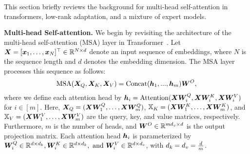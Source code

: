 
This section briefly reviews the background for multi-head self-attention in transformers, low-rank adaptation, and a mixture of expert models.

\vspace{0.5 em}
\noindent
\textbf{Multi-head Self-attention.} We begin by revisiting the architecture of the multi-head self-attention (MSA) layer in Transformer~\cite {vaswani2017attention, dosovitskiy2020image}. Let ${\bm X} = [{\bm x}_1, \dots, {\bm x}_N]^\top \in \mathbb{R}^{N \times d}$ denote an input sequence of embeddings, where $N$ is the sequence length and $d$ denotes the embedding dimension. The MSA layer processes this sequence as follows:
\begin{align}
    \mathrm{MSA}({\bm X}_Q, {\bm X}_K, {\bm X}_V) = \mathrm{Concat}({\bm h}_1,...,{\bm h}_m) \bm{W}^O, \label{eq:msa}
\end{align}
where we define each attention head by ${\bm h}_i = \mathrm{Attention}({\bm X} \bm{W}_i^Q, {\bm X} \bm{W}_i^K, {\bm X} \bm{W}_i^V)$ for $i \in [m]$. 
Here, ${\bm X}_Q = ({\bm X} \bm{W}_1^Q, \ldots, {\bm X} \bm{W}_{m}^{Q})$, $\mathbb{X}_K = ({\bm X} \bm{W}_1^K, \ldots, {\bm X} \bm{W}_m^K)$, and $\mathbb{X}_V = ({\bm X} \bm{W}_1^V, \ldots, {\bm X} \bm{W}_m^V)$ are the query, key, and value matrices, respectively. Furthermore, $m$ is the number of heads, and $\bm{W}^O \in \mathbb{R}^{md_v \times d}$ is the output projection matrix. Each attention head ${\bm h}_i$ is parameterized by $\bm{W}_i^Q \in \mathbb{R}^{d \times d_k}, \bm{W}_i^K \in \mathbb{R}^{d \times d_k}, \text{ and } \bm{W}_i^V \in \mathbb{R}^{d \times d_v}$, with $d_k = d_v = \frac{d}{m}$. 

